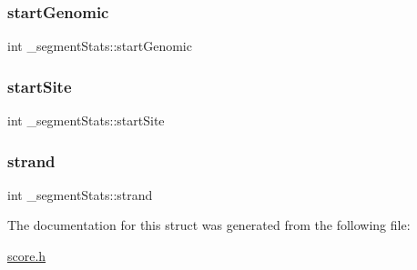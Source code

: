 \subsubsection{\texorpdfstring{start\+Genomic}{startGenomic}}
{\footnotesize\ttfamily int \+\_\+segment\+Stats\+::start\+Genomic}

\mbox{\label{struct__segmentStats_a403f946ddab65393861d93fbb81f0d5a}} 
\subsubsection{\texorpdfstring{start\+Site}{startSite}}
{\footnotesize\ttfamily int \+\_\+segment\+Stats\+::start\+Site}

\mbox{\label{struct__segmentStats_a84cfdd51d1e7fe9555f887c3658e9ced}} 
\subsubsection{\texorpdfstring{strand}{strand}}
{\footnotesize\ttfamily int \+\_\+segment\+Stats\+::strand}



The documentation for this struct was generated from the following file\+:\begin{DoxyCompactItemize}
\item 
\hyperlink{score_8h}{score.\+h}\end{DoxyCompactItemize}
